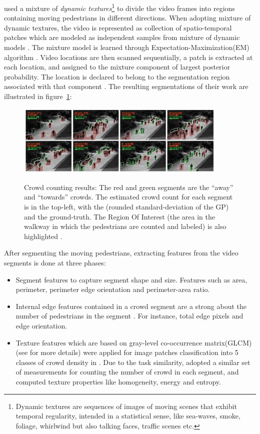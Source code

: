 \citeauthor*{chan2008privacy} used a mixture of \textit{dynamic textures}\footnote{Dynamic textures are sequences of images of moving scenes that exhibit temporal regularity, intended in a statistical sense, like sea-waves, smoke, foliage, whirlwind but also talking faces, traffic scenes etc.} \cite{doretto2003dynamic, chan2008modeling} to divide the video frames into regions containing moving pedestrians in different directions. When adopting mixture of dynamic textures, the video is represented as collection of spatio-temporal patches which are modeled as independent samples from mixture of dynamic models \cite{doretto2003dynamic}. The mixture model is learned through Expectation-Maximization(EM) algorithm \cite{chan2008modeling}. Video locations are then scanned sequentially, a patch is extracted at each location, and assigned to the mixture component of largest posterior probability. The location is declared to belong to the segmentation region associated with that component  \cite{chan2008privacy}. The resulting segmentations of their work are illustrated in figure~\ref{fig:segUcsd}:
\begin{figure}[H]
	\centering
	{\includegraphics[width=0.9\textwidth]{images/segUcsd}}
	\caption{Crowd counting results: The red and green segments are the “away” and “towards” crowds. The estimated crowd count for each segment is in the top-left, with the (rounded standard-deviation of the GP) and the ground-truth. The Region Of Interest (the area in the walkway in which the pedestrians are counted and labeled) is also highlighted \cite{chan2008privacy}.}
	\label{fig:segUcsd}
\end{figure}

After segmenting the moving pedestrians, extracting features from the video segments is done at three phases:
\begin{itemize}
	\item Segment features to capture segment shape and size. Features such as area, perimeter, perimeter edge orientation and perimeter-area ratio. 
	\item Internal edge features contained in a crowd segment are a strong about the number of pedestrians in the segment \cite{davies1995crowd, kong2005counting}. For instance, total edge pixels and edge orientation. 
	\item Texture features which are based on gray-level co-occurrence matrix(GLCM) (see  \cite{haralick1973textural} for more details) were applied for image patches classification into 5 classes of crowd density in \cite{marana1998efficacy}. Due to the task similarity, \citeauthor*{chan2008privacy} adopted a similar set of measurements for counting the number of crowd in each segment, and computed texture properties like homogeneity, energy and entropy. 
\end{itemize} 

